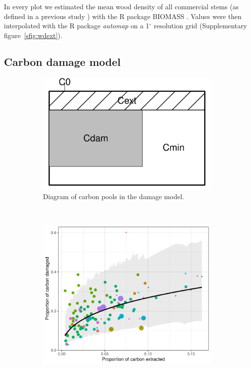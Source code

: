 \documentclass{article}
\begin{document}
In every plot we estimated the mean wood density of all commercial stems (as defined in a previous study \cite{Piponiotc}) with the R package BIOMASS \cite{Rejou-Mechain2017}.
Values were then interpolated with the R package \textit{automap} \cite{gstat} on a 1$^{\circ}$ resolution grid (Supplementary figure~\ref{sfig:wdext}).


\subsection{Carbon damage model}
\label{supmat:cdam}

\begin{figure}
    \centering
    \begin{subfigure}[b]{0.3\textwidth}
        \includegraphics[width=\linewidth]{graphs/schemaDam.pdf}
        \caption{Diagram of carbon pools in the damage model.}\label{fig:schemaDam}
    \end{subfigure}
    ~ 
    \begin{subfigure}[b]{0.55\textwidth}
    \includegraphics[width=\linewidth]{graphs/damModel.pdf}

\end{subfigure}
\end{figure}
\end{document}
